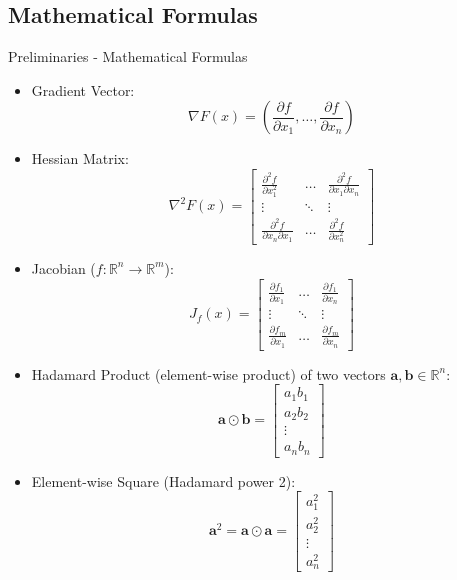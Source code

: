 \documentclass{beamer}
\begin{document}
\subsection{Mathematical Formulas}
\begin{frame}{Preliminaries - Mathematical Formulas}
    \begin{itemize}
        \item Gradient Vector:
        \[
            \nabla F(x) = 
            \left( 
                \frac{\partial f}{\partial x_1}, \dots, \frac{\partial f}{\partial x_n}
            \right)
        \]

        \item Hessian Matrix:
        \[
            \nabla^2 F(x) = 
            \begin{bmatrix}
                \frac{\partial^2 f}{\partial x_1^2} & \dots & \frac{\partial^2 f}{\partial x_1 \partial x_n} \\
                \vdots & \ddots & \vdots \\
                \frac{\partial^2 f}{\partial x_n \partial x_1} & \dots & \frac{\partial^2 f}{\partial x_n^2}
            \end{bmatrix}
        \]
        \item Jacobian ($f: \mathbb{R}^n \rightarrow \mathbb{R}^m$):
    \[
        J_f(x) =
        \begin{bmatrix}
            \frac{\partial f_1}{\partial x_1} & \dots & \frac{\partial f_1}{\partial x_n} \\
            \vdots & \ddots & \vdots \\
            \frac{\partial f_m}{\partial x_1} & \dots & \frac{\partial f_m}{\partial x_n}
        \end{bmatrix}
    \]
    \item Hadamard Product (element-wise product) of two vectors $\mathbf{a}, \mathbf{b} \in \mathbb{R}^n$:
    \[
        \mathbf{a} \odot \mathbf{b} = 
        \begin{bmatrix}
            a_1 b_1 \\
            a_2 b_2 \\
            \vdots \\
            a_n b_n
        \end{bmatrix}
    \]
        \item Element-wise Square (Hadamard power 2):
    \[
        \mathbf{a}^2 = \mathbf{a} \odot \mathbf{a} =
        \begin{bmatrix}
            a_1^2 \\
            a_2^2 \\
            \vdots \\
            a_n^2
        \end{bmatrix}
    \]


\end{itemize}
\end{frame}
\end{document}

